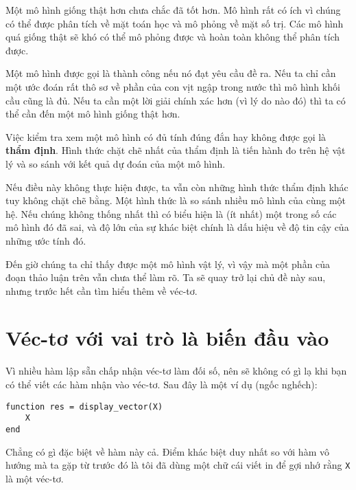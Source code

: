 \documentclass[12pt]{book}
\begin{document}
Một mô hình giống thật hơn chưa chắc đã tốt hơn. Mô hình rất có ích
vì chúng có thể được phân tích về mặt toán học và mô phỏng về
mặt số trị. Các mô hình quá giống thật sẽ khó có thể mô phỏng được
và hoàn toàn không thể phân tích được.

Một mô hình được gọi là thành công nếu nó đạt yêu cầu đề ra. Nếu ta
chỉ cần một ước đoán rất thô sơ về phần của con vịt ngập trong nước
thì mô hình khối cầu cũng là đủ. Nếu ta cần một lời giải chính xác hơn
(vì lý do nào đó) thì ta có thể cần đến một mô hình giống thật hơn.



Việc kiểm tra xem một mô hình có đủ tính đúng đắn hay không được
gọi là {\bf thẩm định}. Hình thức chặt chẽ nhất của thẩm định là 
tiến hành đo trên hệ vật lý và so sánh với kết quả dự đoán của một
mô hình.

Nếu điều này không thực hiện được, ta vẫn còn những hình thức 
thẩm định khác tuy không chặt chẽ bằng. Một hình thức là so sánh
nhiều mô hình của cùng một hệ. Nếu chúng không thống nhất thì
có biểu hiện là (ít nhất) một trong số các mô hình đó đã sai, và
độ lớn của sự khác biệt chính là dấu hiệu về độ tin cậy của những
ước tính đó.

Đến giờ chúng ta chỉ thấy được một mô hình vật lý, vì vậy mà 
một phần của đoạn thảo luận trên vẫn chưa thể làm rõ. Ta sẽ 
quay trở lại chủ đề này sau, nhưng trước hết cần tìm hiểu thêm
về véc-tơ.



\section{Véc-tơ với vai trò là biến đầu vào}

Vì nhiều hàm lập sẵn chấp nhận véc-tơ làm đối số, nên sẽ không
có gì lạ khi bạn có thể viết các hàm nhận vào véc-tơ. Sau đây là
một ví dụ (ngốc nghếch):

\begin{verbatim}
function res = display_vector(X)
    X
end
\end{verbatim}
%
Chẳng có gì đặc biệt về hàm này cả. Điểm khác biệt duy nhất
so với hàm vô hướng mà ta gặp từ trước đó là tôi đã dùng một
chữ cái viết in để gợi nhớ rằng {\tt X} là một véc-tơ.
\end{document}
